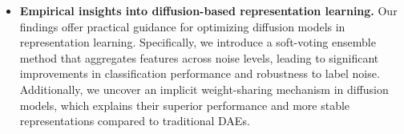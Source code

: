 \begin{itemize}[leftmargin=*]
    \item \textbf{Empirical insights into diffusion-based representation learning.} Our findings offer practical guidance for optimizing diffusion models in representation learning. Specifically, we introduce a soft-voting ensemble method that aggregates features across noise levels, leading to significant improvements in classification performance and robustness to label noise. Additionally, we uncover an implicit weight-sharing mechanism in diffusion models, which explains their superior performance and more stable representations compared to traditional DAEs.
    

\end{itemize}
